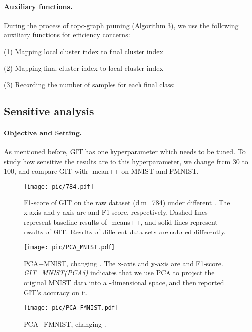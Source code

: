 \documentclass[letterpaper]{article} \usepackage{aaai22}  \usepackage{times}  \usepackage{helvet}  \usepackage{courier}  \usepackage[hyphens]{url}  \usepackage{graphicx} \urlstyle{rm} \def\UrlFont{\rm}  \usepackage{natbib}  \usepackage{caption} \DeclareCaptionStyle{ruled}{labelfont=normalfont,labelsep=colon,strut=off} \frenchspacing  \setlength{\pdfpagewidth}{8.5in}  \setlength{\pdfpageheight}{11in}  \usepackage{subfigure}
\begin{document}
\paragraph{Auxiliary functions.}
During the process of topo-graph pruning (Algorithm 3), we use the following auxiliary functions for efficiency concerns:

(1) Mapping local cluster index to final cluster index



(2) Mapping final cluster index to local cluster index



(3) Recording the number of samples for each final class:


\clearpage
\subsection{Sensitive analysis}
\paragraph{Objective and Setting.} As mentioned before, GIT has one hyperparameter  which needs to be tuned. To study how sensitive the results are to this hyperparameter, we change  from 30 to 100, and compare GIT with -mean++ on MNIST and FMNIST.

\begin{figure}[h]
    \centering
    \texttt{[image: pic/784.pdf]}
    \caption{ F1-score of GIT on the raw dataset (dim=784) under different . The x-axis and y-axis are  and F1-score, respectively. Dashed lines represent baseline results of -means++, and solid lines represent results of GIT. Results of different data sets are colored differently. }
    \label{fig: raw_data }
\end{figure}

\begin{figure}[h]
    \centering
    \texttt{[image: pic/PCA\_MNIST.pdf]}
    \caption{ PCA+MNIST, changing . The x-axis and y-axis are  and F1-score. \textit{GIT\_MNIST(PCA5)} indicates that we use PCA to project the original MNIST data into a -dimensional space, and then reported GIT's accuracy on it. }
    \label{fig:PCA_MNIST}
\end{figure}

\begin{figure}[H]
    \centering
    \texttt{[image: pic/PCA\_FMNIST.pdf]}
    \caption{ PCA+FMNIST, changing . }
    \label{fig:PCA_FMNIST}
\end{figure}
\end{document}

